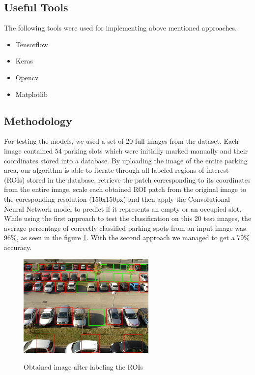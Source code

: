 \documentclass[12pt]{article}
\begin{document}
\subsection{Useful Tools}
The following tools were used for implementing above mentioned approaches.
\begin{itemize}
  \item Tensorflow
  \item Keras
  \item Opencv
  \item Matplotlib
\end{itemize}

\clearpage
\subsection{Methodology}
For testing the models, we used a set of 20 full images from the \cite{cnrpark} dataset.
Each image contained 54 parking slots which were initially marked manually and their coordinates stored into a database. By uploading the image of the entire parking area,
our algorithm is able to iterate through all labeled regions of interest (ROIs) stored in the database, retrieve the patch corresponding to its coordinates from the entire image,
scale each obtained ROI patch from the original image to the coresponding resolution (150x150px)
and then apply the Convolutional Neural Network model to predict if it represents an empty or an occupied slot.
While using the first approach to test the classification on this 20 test images, the average percentage of correctly classified parking spots from an input image was 96\%, as seen in the figure \ref{fig:resultimg}.
With the second approach we managed to get a 79\% accuracy. 

\begin{figure}
\caption{Obtained image after labeling the ROIs}
\includegraphics[width=0.6\textwidth]{2015-11-12_0947}
\label{fig:resultimg}
\end{figure}
\end{document}
